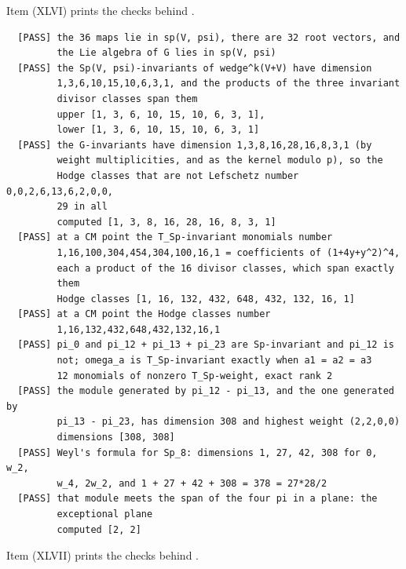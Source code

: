 Item (XLVI) prints the checks behind .

\begin{small}
\begin{verbatim}
  [PASS] the 36 maps lie in sp(V, psi), there are 32 root vectors, and
         the Lie algebra of G lies in sp(V, psi)
  [PASS] the Sp(V, psi)-invariants of wedge^k(V+V) have dimension
         1,3,6,10,15,10,6,3,1, and the products of the three invariant
         divisor classes span them
         upper [1, 3, 6, 10, 15, 10, 6, 3, 1],
         lower [1, 3, 6, 10, 15, 10, 6, 3, 1]
  [PASS] the G-invariants have dimension 1,3,8,16,28,16,8,3,1 (by
         weight multiplicities, and as the kernel modulo p), so the
         Hodge classes that are not Lefschetz number 0,0,2,6,13,6,2,0,0,
         29 in all
         computed [1, 3, 8, 16, 28, 16, 8, 3, 1]
  [PASS] at a CM point the T_Sp-invariant monomials number
         1,16,100,304,454,304,100,16,1 = coefficients of (1+4y+y^2)^4,
         each a product of the 16 divisor classes, which span exactly
         them
         Hodge classes [1, 16, 132, 432, 648, 432, 132, 16, 1]
  [PASS] at a CM point the Hodge classes number
         1,16,132,432,648,432,132,16,1
  [PASS] pi_0 and pi_12 + pi_13 + pi_23 are Sp-invariant and pi_12 is
         not; omega_a is T_Sp-invariant exactly when a1 = a2 = a3
         12 monomials of nonzero T_Sp-weight, exact rank 2
  [PASS] the module generated by pi_12 - pi_13, and the one generated by
         pi_13 - pi_23, has dimension 308 and highest weight (2,2,0,0)
         dimensions [308, 308]
  [PASS] Weyl's formula for Sp_8: dimensions 1, 27, 42, 308 for 0, w_2,
         w_4, 2w_2, and 1 + 27 + 42 + 308 = 378 = 27*28/2
  [PASS] that module meets the span of the four pi in a plane: the
         exceptional plane
         computed [2, 2]
\end{verbatim}
\end{small}

Item (XLVII) prints the checks behind .

